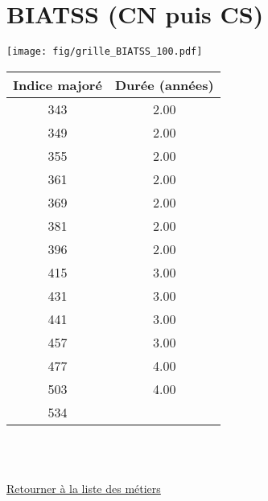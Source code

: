 \newpage 
 
\chapter{BIATSS (CN puis CS)} 

\begin{minipage}{0.55\linewidth}\texttt{[image: fig/grille\_BIATSS\_100.pdf]}\end{minipage} 
\begin{minipage}{0.3\linewidth} 
 \begin{center} 

\begin{tabular}[htb]{|c|c|} 
\hline 
 Indice majoré &  Durée (années) \\ 
\hline \hline 
 343 &  2.00 \\ 
\hline 
 349 &  2.00 \\ 
\hline 
 355 &  2.00 \\ 
\hline 
 361 &  2.00 \\ 
\hline 
 369 &  2.00 \\ 
\hline 
 381 &  2.00 \\ 
\hline 
 396 &  2.00 \\ 
\hline 
 415 &  3.00 \\ 
\hline 
 431 &  3.00 \\ 
\hline 
 441 &  3.00 \\ 
\hline 
 457 &  3.00 \\ 
\hline 
 477 &  4.00 \\ 
\hline 
 503 &  4.00 \\ 
\hline 
 534 &   \\ 
\hline 
\hline 
\end{tabular} 
\end{center} 
 \end{minipage} 

~\\ 
 


   
 \localtableofcontents 

~\\ 
 
 \hyperlink{page.2}{\noindent Retourner à la liste des métiers}

